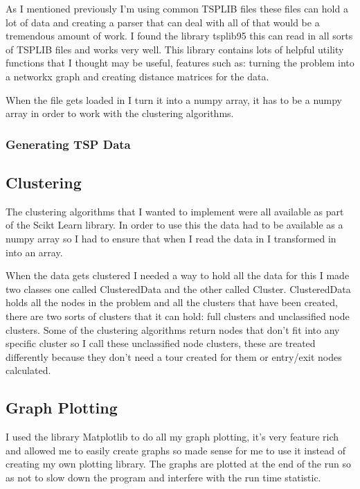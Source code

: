 As I mentioned previously I'm using common TSPLIB files these files can hold a lot of data and creating a parser that can deal with all of that would be a tremendous amount of work. I found the library tsplib95\cite{tsplib95} this can read in all sorts of TSPLIB files and works very well. This library contains lots of helpful utility functions that I thought may be useful, features such as: turning the problem into a networkx\cite{networkx} graph and creating distance matrices for the data.

When the file gets loaded in I turn it into a numpy\cite{numpy} array, it has to be a numpy array in order to work with the clustering algorithms. 

\subsubsection{Generating TSP Data}


\subsection{Clustering}

The clustering algorithms that I wanted to implement were all available as part of the Scikt Learn library. In order to use this the data had to be available as a numpy array so I had to ensure that when I read the data in I transformed in into an array. 

When the data gets clustered I needed a way to hold all the data for this I made two classes one called ClusteredData and the other called Cluster. ClusteredData holds all the nodes in the problem and all the clusters that have been created, there are two sorts of clusters that it can hold: full clusters and unclassified node clusters. Some of the clustering algorithms return nodes that don't fit into any specific cluster so I call these unclassified node clusters, these are treated differently because they don't need a tour created for them or entry/exit nodes calculated. 

\subsection{Graph Plotting}

I used the library Matplotlib\cite{matplotlib} to do all my graph plotting, it's very feature rich and allowed me to easily create graphs so made sense for me to use it instead of creating my own plotting library. The graphs are plotted at the end of the run so as not to slow down the program and interfere with the run time statistic.

